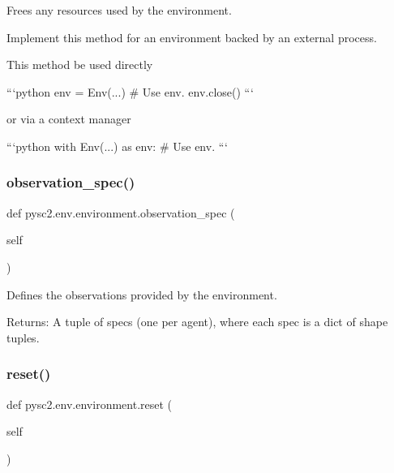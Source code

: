 \begin{DoxyVerb}Frees any resources used by the environment.

Implement this method for an environment backed by an external process.

This method be used directly

```python
env = Env(...)
# Use env.
env.close()
```

or via a context manager

```python
with Env(...) as env:
  # Use env.
```
\end{DoxyVerb}
 \mbox{\label{namespacepysc2_1_1env_1_1environment_a0fee225a83b098e54d402bb36016a26c}} 
\subsubsection{\texorpdfstring{observation\+\_\+spec()}{observation\_spec()}}
{\footnotesize\ttfamily def pysc2.\+env.\+environment.\+observation\+\_\+spec (\begin{DoxyParamCaption}\item[{}]{self }\end{DoxyParamCaption})}

\begin{DoxyVerb}Defines the observations provided by the environment.

Returns:
  A tuple of specs (one per agent), where each spec is a dict of shape
    tuples.
\end{DoxyVerb}
 \mbox{\label{namespacepysc2_1_1env_1_1environment_ac382d147632a99ed4f259f8f0359d1c2}} 
\subsubsection{\texorpdfstring{reset()}{reset()}}
{\footnotesize\ttfamily def pysc2.\+env.\+environment.\+reset (\begin{DoxyParamCaption}\item[{}]{self }\end{DoxyParamCaption})}

